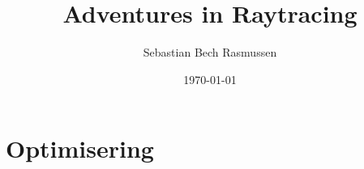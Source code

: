 \documentclass{article}
\title{Adventures in Raytracing}
\author{Sebastian Bech Rasmussen}
\date{\today}
\begin{document}
\begin{titlepage}
    \maketitle
\end{titlepage}

\section{Optimisering}

\inputminted[linenos, firstline=10, lastline=25]{rust}{src/main.rs}
\end{document}
